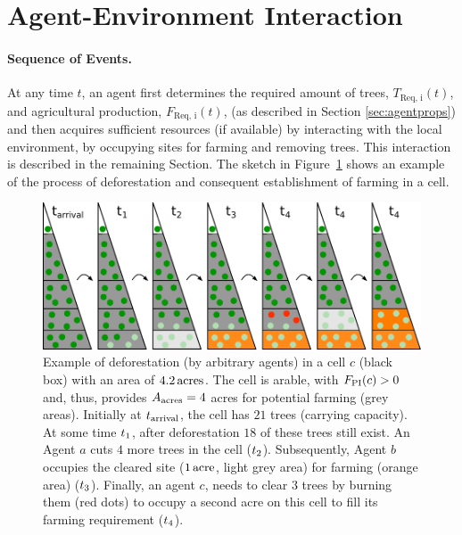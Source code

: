\FloatBarrier
\section{Agent-Environment Interaction} \label{sec:Harvest}
\paragraph{Sequence of Events.}
At any time $t$, an agent first determines the required amount of trees, $T_\text{Req, i}(t)$, and agricultural production, $F_\text{Req, i}(t)$, (as described in Section \ref{sec:agentprops}) and then acquires sufficient resources (if available) by interacting with the local environment, by occupying sites for farming and removing trees.
This interaction is described in the remaining Section.
The sketch in Figure~\ref{fig:treeburning} shows an example of the process of deforestation and consequent establishment of farming in a cell.
\begin{figure}
	\centering
	\includegraphics[width=\textwidth]{images/SketchABM2/burningSketch_triangle.pdf}
	\caption{Example of deforestation (by arbitrary agents) in a cell $c$ (black box) with an area of $4.2\, \rm{acres}$.
		The cell is arable, with $F_{\rm PI}(c)>0$ and, thus, provides $A_{\rm acres}=4$ acres for potential farming (grey areas).
		Initially at $t_{\rm arrival}$, the cell has $21$ trees (carrying capacity).
		At some time $t_{\rm 1}$, after deforestation $18$ of these trees still exist. 
		An Agent $a$ cuts $4$ more trees in the cell (\ra $t_{\rm 2}$). 
		Subsequently, Agent $b$ occupies the cleared site ($1\, {\rm acre}$, light grey area) for farming (orange area) (\ra $t_{\rm 3}$). 
		Finally, an agent $c$, needs to clear $3$ trees by burning them (red dots) to occupy a second acre on this cell to fill its farming requirement (\ra $t_{\rm 4}$).}
	\label{fig:treeburning}
\end{figure}


